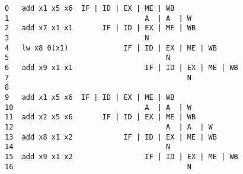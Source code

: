 \documentclass[varwidth]{standalone}
\begin{document}
  \begin{BVerbatim}[]
0   add x1 x5 x6  IF | ID | EX | ME | WB
1                                A  | A  | W
2   add x7 x1 x1       IF | ID | EX | ME | WB
3                                N
4   lw x8 0(x1)             IF | ID | EX | ME | WB
5                                     N
6   add x9 x1 x1                 IF | ID | EX | ME | WB
7                                          N
8
9   add x1 x5 x6  IF | ID | EX | ME | WB
10                               A  | A  | W
11  add x2 x5 x6       IF | ID | EX | ME | WB
12                                    A  | A  | W
13  add x8 x1 x2            IF | ID | EX | ME | WB
14                                    N
15  add x9 x1 x2                 IF | ID | EX | ME | WB
16                                         N
  \end{BVerbatim}
\end{document}
